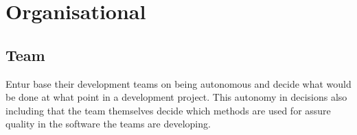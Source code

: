 





\section{Organisational}
\subsection{Team}
Entur base their development teams on being autonomous and decide what would be done at what point in a development project. This autonomy in decisions also including that the team themselves decide which methods are used for assure quality in the software the teams are developing. 

